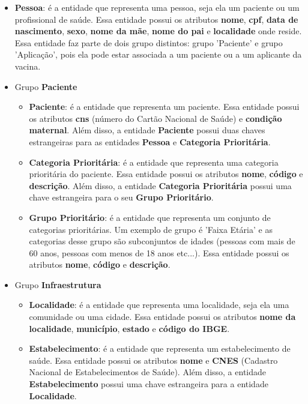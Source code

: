 \begin{itemize}
  \item \textbf{Pessoa}: é a entidade que representa uma pessoa, seja ela um paciente ou um profissional de saúde. Essa entidade possui os atributos \textbf{nome}, \textbf{cpf}, \textbf{data de nascimento}, \textbf{sexo}, \textbf{nome da mãe}, \textbf{nome do pai} e \textbf{localidade} onde reside. Essa entidade faz parte de dois grupo distintos: grupo 'Paciente' e grupo 'Aplicação', pois ela pode estar associada a um paciente ou a um aplicante da vacina.
  \item Grupo \textbf{Paciente}
  \begin{itemize}
    \item \textbf{Paciente}: é a entidade que representa um paciente. Essa entidade possui os atributos \textbf{cns} (número do Cartão Nacional de Saúde) e \textbf{condição maternal}. Além disso, a entidade \textbf{Paciente} possui duas chaves estrangeiras para as entidades \textbf{Pessoa} e \textbf{Categoria Prioritária}.
    \item \textbf{Categoria Prioritária}: é a entidade que representa uma categoria prioritária do paciente. Essa entidade possui os atributos \textbf{nome}, \textbf{código} e \textbf{descrição}. Além disso, a entidade \textbf{Categoria Prioritária} possui uma chave estrangeira para o seu \textbf{Grupo Prioritário}.
    \item \textbf{Grupo Prioritário}: é a entidade que representa um conjunto de categorias prioritárias. Um exemplo de grupo é 'Faixa Etária' e as categorias desse grupo são subconjuntos de idades (pessoas com mais de 60 anos, pessoas com menos de 18 anos etc...). Essa entidade possui os atributos \textbf{nome}, \textbf{código} e \textbf{descrição}.
  \end{itemize}
  \item Grupo \textbf{Infraestrutura}
  \begin{itemize}
    \item \textbf{Localidade}: é a entidade que representa uma localidade, seja ela uma comunidade ou uma cidade. Essa entidade possui os atributos \textbf{nome da localidade}, \textbf{município}, \textbf{estado} e \textbf{código do IBGE}.
    \item \textbf{Estabelecimento}: é a entidade que representa um estabelecimento de saúde. Essa entidade possui os atributos \textbf{nome} e \textbf{CNES} (Cadastro Nacional de Estabelecimentos de Saúde). Além disso, a entidade \textbf{Estabelecimento} possui uma chave estrangeira para a entidade \textbf{Localidade}.

\end{itemize}
\end{itemize}
